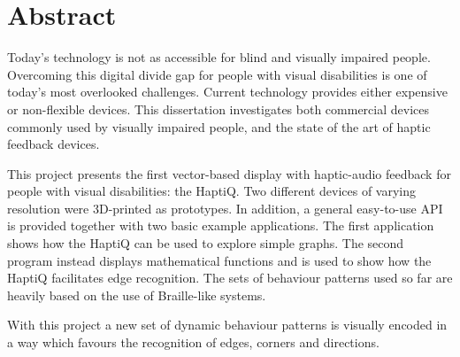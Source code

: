 \section{Abstract}

Today's technology is not as accessible for blind and visually impaired people.
Overcoming this digital divide gap for people with visual disabilities is one of today's most overlooked challenges.
Current technology provides either expensive or non-flexible devices. This dissertation investigates both commercial devices commonly used by visually impaired people, and the state of the art of haptic feedback devices.

This project presents the first vector-based display with haptic-audio feedback for people with visual disabilities: the HaptiQ. 
Two different devices of varying resolution were 3D-printed as prototypes.
In addition, a general easy-to-use API is provided together with two basic example applications. The first application shows how the HaptiQ can be used to explore simple graphs. The second program instead displays mathematical functions and is used to show how the HaptiQ facilitates edge recognition.
The sets of behaviour patterns used so far are heavily based on the use of Braille-like systems. 

With this project a new set of dynamic behaviour patterns is visually encoded in a way which favours the recognition of edges, corners and directions. 